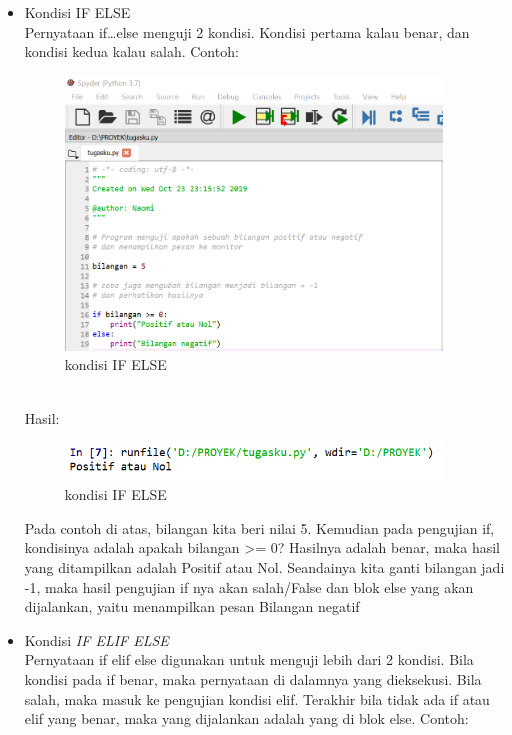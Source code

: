 \begin{enumerate}
\begin{itemize}
        \item Kondisi IF ELSE\\
        Pernyataan if…else menguji 2 kondisi. Kondisi pertama kalau benar, dan kondisi kedua kalau salah. Contoh:
    \begin{figure}[!htbp]
    \centering
    \includegraphics[width=10cm]{gambar2/ifelse.png}
    \caption{kondisi IF ELSE}
    \end{figure}\\
    Hasil:
    \begin{figure}[!htbp]
    \centering
    \includegraphics[width=10cm]{gambar2/ifelse1.png}
    \caption{kondisi IF ELSE}
    \end{figure}
    \newpage
        Pada contoh di atas, bilangan kita beri nilai 5. Kemudian pada pengujian if, kondisinya adalah apakah bilangan >= 0? Hasilnya adalah benar, maka hasil yang ditampilkan adalah Positif atau Nol. Seandainya kita ganti bilangan jadi -1, maka hasil pengujian if nya akan salah/False dan blok else yang akan dijalankan, yaitu menampilkan pesan Bilangan negatif
        \item Kondisi \textit{IF ELIF ELSE}\\
        Pernyataan if elif else digunakan untuk menguji lebih dari 2 kondisi. Bila kondisi pada if benar, maka pernyataan di dalamnya yang dieksekusi. Bila salah, maka masuk ke pengujian kondisi elif. Terakhir bila tidak ada if atau elif yang benar, maka yang dijalankan adalah yang di blok else. Contoh:
    \begin{figure}[!htbp]
    \centering

\end{figure}
\end{itemize}
\end{enumerate}
